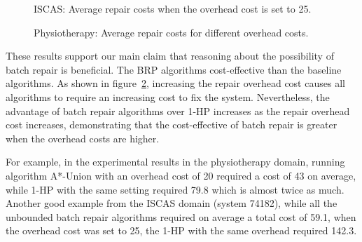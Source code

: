 \documentclass[review]{elsarticle}
\begin{document}

\begin{figure}[h]{}
\centering
{}
  \caption{ISCAS: Average repair costs when the overhead cost is set to 25.
}
  \label{fig:I-batch-base-single}
\end{figure}

\begin{figure}{}
\centering
{}
  \caption{Physiotherapy: Average repair costs for different overhead costs.
}
\label{fig:P-batch-base-single}
\end{figure}

These results support our main claim that reasoning about the possibility of batch repair is beneficial. The BRP algorithms cost-effective than the baseline algorithms. 
As shown in figure~\ref{fig:P-batch-base-single}, increasing the repair overhead cost causes all algorithms to require an increasing cost to fix the system. Nevertheless, the advantage of batch repair algorithms over 1-HP increases as the repair overhead cost increases, demonstrating that the cost-effective of batch repair is greater when the overhead costs are higher. 

For example, in the experimental results in the physiotherapy domain, running algorithm A*-Union with an overhead cost of 20 required a cost of 43 on average, while 1-HP with the same setting required 79.8 which is almost twice as much.
Another good example from the ISCAS domain (system 74182), while all the unbounded batch repair algorithms required on average a total cost of 59.1, when the overhead cost was set to 25, the 1-HP with the same overhead required 142.3.
\end{document}
